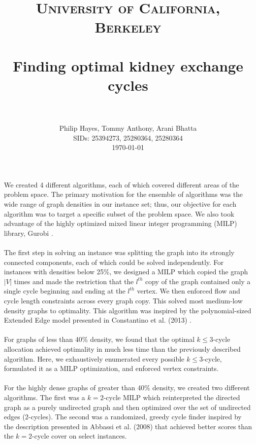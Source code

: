 \documentclass[paper=a4, fontsize=11pt]{scrartcl}
\title{
        \usefont{OT1}{bch}{b}{n}
        \normalfont \normalsize \textsc{University of California, Berkeley} \\ [5pt]
        \horrule{0.5pt} \\[0.4cm]
        \huge Finding optimal kidney exchange cycles \\
        \horrule{2pt} \\[0.5cm]
}
\author{
        \normalfont 								\normalsize
        Philip Hayes, Tommy Anthony, Arani Bhatta\\[-3pt]		\normalsize
        SIDs: 25394273, 25280364, 25280364 \\[-3pt]\normalsize
        \today
}
\date{}
\begin{document}
\maketitle

We created 4 different algorithms, each of which covered different areas of the problem
space. The primary motivation for the ensemble of algorithms was the wide range of
graph densities in our instance set; thus, our objective for each algorithm was to target a
specific subset of the problem space. We also took advantage of the highly optimized
mixed linear integer programming (MILP) library, Gurobi \cite{Gurobi15}.

\paragraph{}

The first step in solving an instance was splitting the graph into its strongly connected
components, each of which could be solved independently. For instances with densities
below 25\%, we designed a MILP which copied the graph $|V|$ times and made the restriction
that the $l^{th}$ copy of the graph contained only a single cycle beginning and ending at
the $l^{th}$ vertex. We then enforced flow and cycle length constraints across every graph
copy. This solved most medium-low density graphs to optimality. This algorithm was inspired
by the polynomial-sized Extended Edge model presented in Constantino et al. (2013)
\cite{Constantino13}.

\paragraph{}

For graphs of less than 40\% density, we found that the optimal $k\le 3$-cycle allocation
achieved optimality in much less time than the previously described algorithm. Here, we exhaustively
enumerated every possible $k\le 3$-cycle, formulated it as a MILP optimization, and enforced vertex
constraints.

\paragraph{}

For the highly dense graphs of greater than 40\% density, we created two different algorithms.
The first was a $k=2$-cycle MILP which reinterpreted the directed graph as a purely undirected
graph and then optimized over the set of undirected edges (2-cycles). The second was a randomized,
greedy cycle finder inspired by the description presented in Abbassi et al. (2008) \cite{Abbassi08}
that achieved better scores than the $k=2$-cycle cover on select instances.
\end{document}
